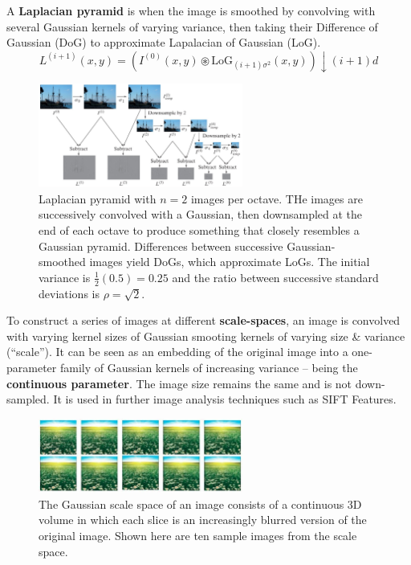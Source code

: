 \documentclass[a4paper,11pt]{article}
\begin{document}
A \textbf{Laplacian pyramid} is when the image is smoothed by convolving with several Gaussian kernels of varying variance, then taking their Difference of Gaussian (DoG) to approximate Lapalacian of Gaussian (LoG).
\[
    L^{(i+1)} (x,y) = \left( I^{(0)} (x,y) \circledast \text{LoG}_{(i+1)\sigma^2} (x,y) \right) \downarrow (i + 1) d
\]

\begin{figure}[H]
    \centering
    \includegraphics[width=0.6\textwidth]{images/laplacianpyramids.png}
    \caption{
        Laplacian pyramid with $n = 2$ images per octave.
        THe images are successively convolved with a Gaussian, then downsampled at the end of each octave to produce something that closely resembles a Gaussian pyramid.
        Differences between successive Gaussian-smoothed images yield DoGs, which approximate LoGs.
        The initial variance is $\frac{1}{2} (0.5) = 0.25$ and the ratio between successive standard deviations is $\rho = \sqrt{2}$.
    }
\end{figure}

To construct a series of images at different \textbf{scale-spaces}, an image is convolved with varying kernel sizes of Gaussian smooting kernels of varying size \& variance (``scale'').
It can be seen as an embedding of the original image into a one-parameter family of Gaussian kernels of increasing variance -- being the \textbf{continuous parameter}.
The image size remains the same and is not down-sampled.
It is used in further image analysis techniques such as SIFT Features.

\begin{figure}[H]
    \centering
    \includegraphics[width=0.6\textwidth]{images/gaussianscalespace.png}
    \caption{
        The Gaussian scale space of an image consists of a continuous 3D volume in which each slice is an increasingly blurred version of the original image.
        Shown here are ten sample images from the scale space.
    }
\end{figure}
\end{document}
